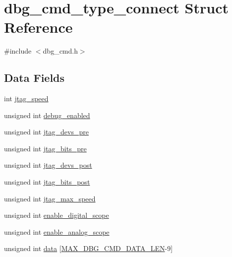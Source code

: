 \hypertarget{structdbg__cmd__type__connect}{\section{dbg\-\_\-cmd\-\_\-type\-\_\-connect Struct Reference}
\label{structdbg__cmd__type__connect}
}


{\ttfamily \#include $<$dbg\-\_\-cmd.\-h$>$}

\subsection*{Data Fields}
\begin{DoxyCompactItemize}
\item 
int \hyperlink{structdbg__cmd__type__connect_a46e35e0c4106e70b82f3a8961e735ab2}{jtag\-\_\-speed}
\item 
unsigned int \hyperlink{structdbg__cmd__type__connect_a641ec70530418c7d2b8aef7e638d4a71}{debug\-\_\-enabled}
\item 
unsigned int \hyperlink{structdbg__cmd__type__connect_aac2104a47b226a8d04018b775a3b9fd5}{jtag\-\_\-devs\-\_\-pre}
\item 
unsigned int \hyperlink{structdbg__cmd__type__connect_a6f238ba20b72ab6f00f7f9a399e2fa68}{jtag\-\_\-bits\-\_\-pre}
\item 
unsigned int \hyperlink{structdbg__cmd__type__connect_a90dd173c303603d84b29e370867f31d9}{jtag\-\_\-devs\-\_\-post}
\item 
unsigned int \hyperlink{structdbg__cmd__type__connect_a78a4d89034acb5a7f350517ca435bcf4}{jtag\-\_\-bits\-\_\-post}
\item 
unsigned int \hyperlink{structdbg__cmd__type__connect_afab09200baf8322f1d8e65fc4669c32c}{jtag\-\_\-max\-\_\-speed}
\item 
unsigned int \hyperlink{structdbg__cmd__type__connect_ac3fe8764cbd797e43e0dc2c4977659b5}{enable\-\_\-digital\-\_\-scope}
\item 
unsigned int \hyperlink{structdbg__cmd__type__connect_a8f69251f33a0e0c36839fa771ec1993e}{enable\-\_\-analog\-\_\-scope}
\item 
unsigned int \hyperlink{structdbg__cmd__type__connect_ae7632a28dd6ad1e333af08fca1d0f6cb}{data} \mbox{[}\hyperlink{dbg__cmd_8h_a4552ec15033c8a68870cdf80eda5470c}{M\-A\-X\-\_\-\-D\-B\-G\-\_\-\-C\-M\-D\-\_\-\-D\-A\-T\-A\-\_\-\-L\-E\-N}-\/9\mbox{]}
\end{DoxyCompactItemize}


